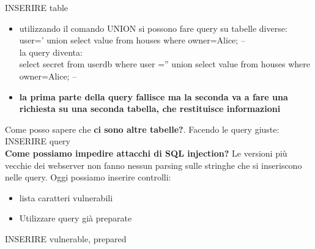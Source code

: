 \documentclass[12pt]{article}
\begin{document}
				INSERIRE table\\
				
				\begin{itemize}
					\item utilizzando il comando UNION si possono fare query su tabelle diverse:\\
					user=’ union select value from houses where owner=Alice; – \\
					la query diventa:\\
					select secret from userdb where user =” union select value from houses
					where owner=Alice; –
					\item \textbf{la prima parte della query fallisce ma la seconda va a fare una richiesta su una seconda tabella, che restituisce informazioni}
				\end{itemize}
				
				Come posso sapere che \textbf{ci sono altre tabelle?}. Facendo le query giuste:\\
				
				INSERIRE query\\
				
				\textbf{Come possiamo impedire attacchi di SQL injection?} Le versioni più vecchie dei webserver non fanno nessun parsing sulle stringhe che si inseriscono nelle query. Oggi possiamo inserire controlli:
				\begin{itemize}
					\item lista caratteri vulnerabili
					\item Utilizzare query già preparate
				\end{itemize}
			
				INSERIRE vulnerable, prepared\\
				
\end{document}
